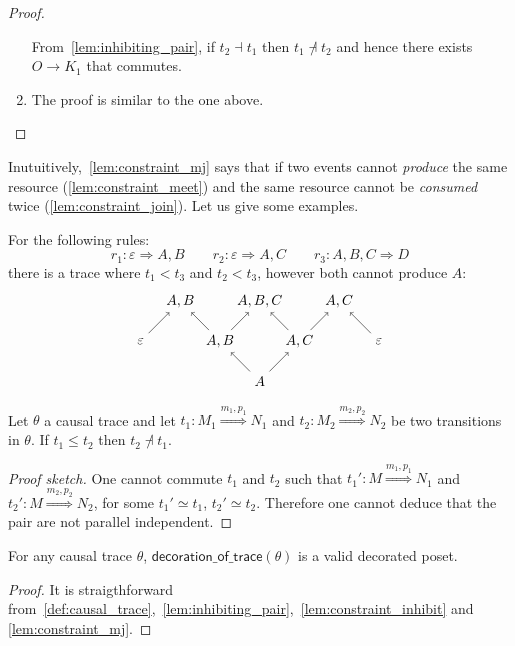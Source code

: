 \begin{proof}
\begin{enumerate}
    From~\autoref{lem:inhibiting_pair}, if $t_2\dashv t_1$ then $t_1\not\dashv t_2$ and hence there exists $O\to K_1$ that commutes.
    \item The proof is similar to the one above.
  \end{enumerate}
\end{proof}

Inutuitively,~\autoref{lem:constraint_mj} says that if two events cannot \emph{produce} the same resource (\autoref{lem:constraint_meet}) and the same resource cannot be \emph{consumed} twice (\autoref{lem:constraint_join}). Let us give some examples.
\begin{example}
  For the following rules:
  \[
  r_1:\varepsilon \Rightarrow A,B \qquad r_2: \varepsilon \Rightarrow A,C \qquad r_3: A,B,C \Rightarrow D
  \]
  there is a trace where $t_1<t_3$ and $t_2<t_3$, however both cannot produce $A$:
    \[
    \begin{tikzpicture} %
      \node (o) at (0,-1) {\(A\)};
      \node (r3) at (0,1) {\(A,B,C\)};
      \node (o1) at (-1,0) {\(A,B\)};
      \node (o2) at (1,0) {\(A,C\)};
      \node (r1) at (-2,1) {\(A,B\)};
      \node (r2) at (2,1) {\(A,C\)};
      \node (k1) at (-3,0) {\(\varepsilon\)};
      \node (k2) at (3,0) {\(\varepsilon\)};
      \draw [->] (o) -- (o1);
      \draw [->] (o) -- (o2);
      \draw [->] (o1) -- (r3);
      \draw [->] (o2) -- (r3);
      \draw [->] (o1) -- (r1);
      \draw [->] (o2) -- (r2);
      \draw [->] (k1) -- (r1);
      \draw [->] (k2) -- (r2);
    \end{tikzpicture}
    \]
\end{example}


\begin{lemma}
  \label{lem:constraint_inhibit}
  Let $\theta$ a causal trace and let $t_1:M_1\overset{m_1,p_1}{\Rightarrow}N_1$ and $t_2:M_2\overset{m_2,p_2}{\Rightarrow}N_2$ be two transitions in $\theta$.
  If $t_1 \leq t_2$ then $t_2\not\dashv t_1$.
\end{lemma}
\begin{proof}[Proof sketch]
  One cannot commute $t_1$ and $t_2$ such that $t_1':M\overset{m_1,p_1}{\Rightarrow}N_1$ and $t_2':M\overset{m_2,p_2}{\Rightarrow}N_2$, for some $t_1'\simeq t_1$, $t_2'\simeq t_2$. Therefore one cannot deduce that the pair are not parallel independent.
\end{proof}


\begin{lemma}
  \label{prop:app_constraints_poset}
  For any causal trace $\theta$, $\mathsf{decoration\_of\_trace}(\theta)$ is a valid decorated poset.
\end{lemma}
\begin{proof}
  It is straigthforward from~\autoref{def:causal_trace},~\autoref{lem:inhibiting_pair},~\autoref{lem:constraint_inhibit} and \autoref{lem:constraint_mj}.
\end{proof}
